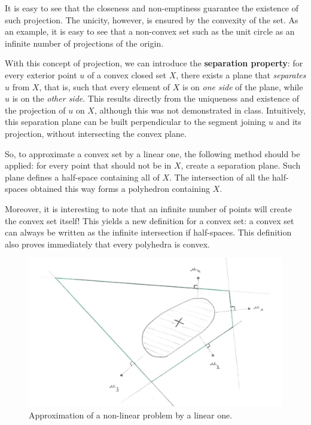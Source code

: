 It is easy to see that the closeness and non-emptiness guarantee the existence of such projection. The unicity, however, is ensured by the convexity of the set. As an example, it is easy to see that a non-convex set such as the unit circle as an infinite number of projections of the origin.


With this concept of projection, we can introduce the \textbf{separation property}: for every exterior point $u$ of a convex closed set $X$, there exists a plane that \textit{separates} $u$ from $X$, that is, such that every element of $X$ is on \textit{one side} of the plane, while $u$ is on the \textit{other side}. This results directly from the uniqueness and existence of the projection of $u$ on $X$, although this was not demonstrated in class. Intuitively, this separation plane can be built perpendicular to the segment joining $u$ and its projection, without intersecting the convex plane.

So, to approximate a convex set by a linear one, the following method should be applied: for every point that should not be in $X$, create a separation plane. Such plane defines a half-space containing all of $X$. The intersection of all the half-spaces obtained this way forms a polyhedron containing $X$.

Moreover, it is interesting to note that an infinite number of points will create the convex set itself! This yields a new definition for a convex set: a convex set can always be written as the infinite intersection if half-spaces. This definition also proves immediately that every polyhedra is convex.

\begin{figure}[H]
\centering
\includegraphics[scale=.4]{./images/Course2_Scan}
\caption{Approximation of a non-linear problem by a linear one.}
\label{labello}
\end{figure}
%

